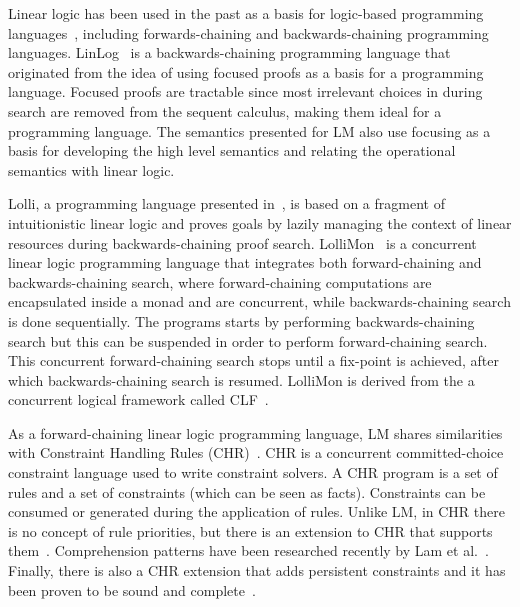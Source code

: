Linear logic has been used in the past as a basis for logic-based programming
languages~\cite{Miller85anoverview}, including forwards-chaining and
backwards-chaining programming languages.
LinLog~\cite{Andreoli92logicprogramming} is a backwards-chaining programming
language that originated from the idea of using focused proofs as a basis for a
programming language. Focused proofs are tractable since most irrelevant
choices in during search are removed from the sequent calculus, making them
ideal for a programming language. The semantics presented for LM also use
focusing as a basis for developing the high level semantics and relating the
operational semantics with linear logic.

Lolli, a programming language presented in~\cite{Hodas94logicprogramming}, is
based on a fragment of intuitionistic linear logic and proves goals by lazily
managing the context of linear resources during backwards-chaining proof search.
LolliMon~\cite{Lopez:2005:MCL:1069774.1069778} is a concurrent linear logic
programming language that integrates both forward-chaining and
backwards-chaining search, where forward-chaining computations are encapsulated
inside a monad and are concurrent, while backwards-chaining search is done
sequentially. The programs starts by performing backwards-chaining search but
this can be suspended in order to perform forward-chaining search. This
concurrent forward-chaining search stops until a fix-point is achieved, after
which backwards-chaining search is resumed. LolliMon is derived from the a
concurrent logical framework called
CLF~\cite{Watkins:2004uq,Cervesato02aconcurrent,Watkins03aconcurrent}.

As a forward-chaining linear logic programming language, LM shares similarities
with Constraint Handling Rules
(CHR)~\cite{Betz:2005kx,Betz:2013:LBA:2422085.2422086}.  CHR is a concurrent
committed-choice constraint language used to write constraint solvers. A CHR
program is a set of rules and a set of constraints (which can be seen as facts).
Constraints can be consumed or generated during the application of rules.
Unlike LM, in CHR there is no concept of rule priorities, but there is an
extension to CHR that supports them~\cite{DeKoninck:2007:URP:1273920.1273924}.
Comprehension patterns have been researched recently by Lam et
al.~\cite{DBLP:journals/corr/LamC14}.  Finally, there is also a CHR extension
that adds persistent constraints and it has been proven to be sound and
complete~\cite{DBLP:journals/corr/abs-1007-3829}.
